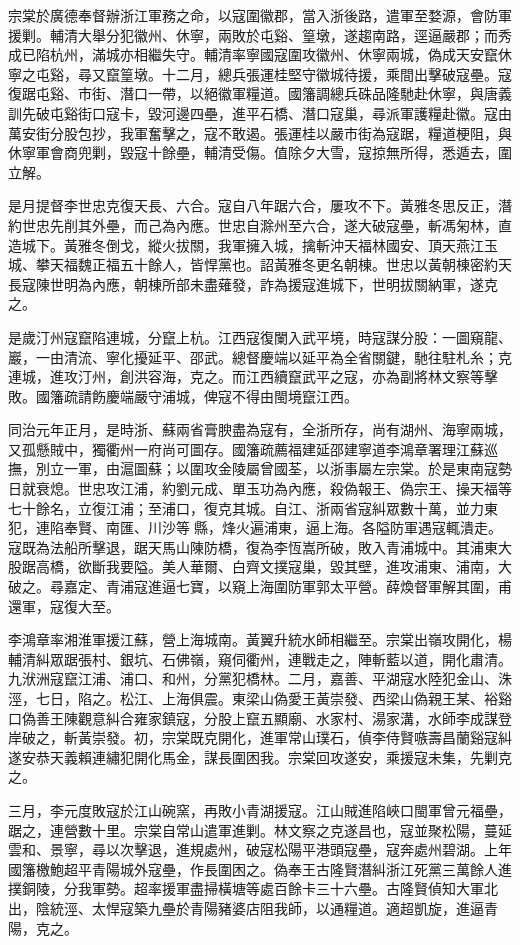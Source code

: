\begin{pinyinscope}
宗棠於廣德奉督辦浙江軍務之命，以寇圍徽郡，當入浙後路，遣軍至婺源，會防軍援剿。輔清大舉分犯徽州、休寧，兩敗於屯谿、篁墩，遂趨南路，逕逼嚴郡；而秀成已陷杭州，滿城亦相繼失守。輔清率寧國寇圍攻徽州、休寧兩城，偽成天安竄休寧之屯谿，尋又竄篁墩。十二月，總兵張運桂堅守徽城待援，乘間出擊破寇壘。寇復踞屯谿、市街、潛口一帶，以絕徽軍糧道。國籓調總兵硃品隆馳赴休寧，與唐義訓先破屯谿街口寇卡，毀河邊四壘，進平石橋、潛口寇巢，尋派軍護糧赴徽。寇由萬安街分股包抄，我軍奮擊之，寇不敢遏。張運桂以嚴市街為寇踞，糧道梗阻，與休寧軍會商兜剿，毀寇十餘壘，輔清受傷。值除夕大雪，寇掠無所得，悉遁去，圍立解。

是月提督李世忠克復天長、六合。寇自八年踞六合，屢攻不下。黃雅冬思反正，潛約世忠先削其外壘，而己為內應。世忠自滁州至六合，遂大破寇壘，斬馮匊林，直造城下。黃雅冬倒戈，縱火拔關，我軍擁入城，擒斬沖天福林國安、頂天燕江玉城、攀天福魏正福五十餘人，皆悍黨也。詔黃雅冬更名朝棟。世忠以黃朝棟密約天長寇陳世明為內應，朝棟所部未盡薙發，詐為援寇進城下，世明拔關納軍，遂克之。

是歲汀州寇竄陷連城，分竄上杭。江西寇復闌入武平境，時寇謀分股：一圖窺龍、巖，一由清流、寧化擾延平、邵武。總督慶端以延平為全省關鍵，馳往駐札糸；克連城，進攻汀州，創洪容海，克之。而江西續竄武平之寇，亦為副將林文察等擊敗。國籓疏請飭慶端嚴守浦城，俾寇不得由閩境竄江西。

同治元年正月，是時浙、蘇兩省膏腴盡為寇有，全浙所存，尚有湖州、海寧兩城，又孤懸賊中，獨衢州一府尚可圖存。國籓疏薦福建延邵建寧道李鴻章署理江蘇巡撫，別立一軍，由滬圖蘇；以圍攻金陵屬曾國荃，以浙事屬左宗棠。於是東南寇勢日就衰熄。世忠攻江浦，約劉元成、單玉功為內應，殺偽報王、偽宗王、操天福等七十餘名，立復江浦；至浦口，復克其城。自江、浙兩省寇糾眾數十萬，並力東犯，連陷奉賢、南匯、川沙等縣，烽火遍浦東，逼上海。各隘防軍遇寇輒潰走。寇既為法船所擊退，踞天馬山陳防橋，復為李恆嵩所破，敗入青浦城中。其浦東大股踞高橋，欲斷我要隘。美人華爾、白齊文撲寇巢，毀其壁，進攻浦東、浦南，大破之。尋嘉定、青浦寇進逼七寶，以窺上海圍防軍郭太平營。薛煥督軍解其圍，甫還軍，寇復大至。

李鴻章率湘淮軍援江蘇，營上海城南。黃翼升統水師相繼至。宗棠出嶺攻開化，楊輔清糾眾踞張村、銀坑、石佛嶺，窺伺衢州，連戰走之，陣斬藍以道，開化肅清。九洑洲寇竄江浦、浦口、和州，分黨犯橋林。二月，嘉善、平湖寇水陸犯金山、洙涇，七日，陷之。松江、上海俱震。東梁山偽愛王黃崇發、西梁山偽親王某、裕谿口偽善王陳觀意糾合雍家鎮寇，分股上竄五顯廟、水家村、湯家溝，水師李成謀登岸破之，斬黃崇發。初，宗棠既克開化，進軍常山璞石，偵李侍賢嗾壽昌蘭谿寇糾遂安恭天義賴連繡犯開化馬金，謀長圍困我。宗棠回攻遂安，乘援寇未集，先剿克之。

三月，李元度敗寇於江山碗窯，再敗小青湖援寇。江山賊進陷峽口閩軍曾元福壘，踞之，連營數十里。宗棠自常山遣軍進剿。林文察之克遂昌也，寇並聚松陽，蔓延雲和、景寧，尋以次擊退，進規處州，破寇松陽平港頭寇壘，寇奔處州碧湖。上年國籓檄鮑超平青陽城外寇壘，作長圍困之。偽奉王古隆賢潛糾浙江死黨三萬餘人進撲銅陵，分我軍勢。超率援軍盡掃橫塘等處百餘卡三十六壘。古隆賢偵知大軍北出，陰統涇、太悍寇築九壘於青陽豬婆店阻我師，以通糧道。適超凱旋，進逼青陽，克之。


\end{pinyinscope}
